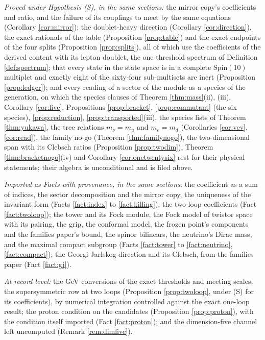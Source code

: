 \documentclass[11pt]{article}
\theoremstyle{definition}
\begin{document}
\emph{Proved under Hypothesis (S), in the same sections:} the mirror copy's coefficients and ratio, and the failure of its couplings to meet by the same equations (Corollary \ref{cor:mirror}); the doublet-heavy direction (Corollary \ref{cor:direction}), the exact rationals of the table (Proposition \ref{prop:table}) and the exact endpoints of the four splits (Proposition \ref{prop:splits}), all of which use the coefficients of the derived content with its lepton doublet, the one-threshold spectrum of Definition \ref{def:spectrum}; that every state in the state space is in a complete $\mathrm{Spin}(10)$ multiplet and exactly eight of the sixty-four sub-multisets are inert (Proposition \ref{prop:ledger}); and every reading of a sector of the module as a species of the generation, on which the species clauses of Theorem \ref{thm:mass}(ii), (iii), Corollary \ref{cor:five}, Propositions \ref{prop:bracket}, \ref{prop:commutant} (the six species), \ref{prop:reduction}, \ref{prop:transported}(iii), the species lists of Theorem \ref{thm:yukawa}, the tree relations $m_{\nu} = m_{u}$ and $m_{e} = m_{d}$ (Corollaries \ref{cor:vev}, \ref{cor:read}), the family no-go (Theorem \ref{thm:familynogo}), the two-dimensional span with its Clebsch ratios (Proposition \ref{prop:twodim}), Theorem \ref{thm:bracketnogo}(iv) and Corollary \ref{cor:onetwentysix} rest for their physical statements; their algebra is unconditional and is filed above.

\emph{Imported as Facts with provenance, in the same sections:} the coefficient as a sum of indices, the sector decomposition and the mirror copy, the uniqueness of the invariant form (Facts \ref{fact:index} to \ref{fact:killing}); the two-loop coefficients (Fact \ref{fact:twoloop}); the tower and its Fock module, the Fock model of twistor space with its pairing, the grip, the conformal model, the frozen point's components and the families paper's bound, the spinor bilinears, the neutrino's Dirac mass, and the maximal compact subgroup (Facts \ref{fact:tower} to \ref{fact:neutrino}, \ref{fact:compact}); the Georgi-Jarlskog direction and its Clebsch, from the families paper (Fact \ref{fact:gj}).

\emph{At record level:} the GeV conversions of the exact thresholds and meeting scales; the supersymmetric row at two loops (Proposition \ref{prop:twoloop}, under (S) for its coefficients), by numerical integration controlled against the exact one-loop result; the proton condition on the candidates (Proposition \ref{prop:proton}), with the condition itself imported (Fact \ref{fact:proton}); and the dimension-five channel left uncomputed (Remark \ref{rem:dimfive}).
\end{document}
